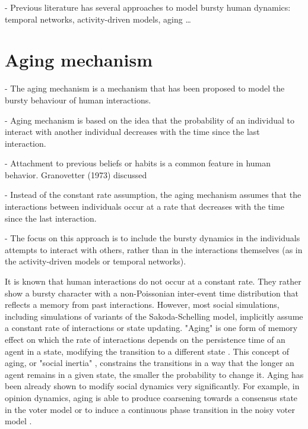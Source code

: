 - Previous literature has several approaches to model bursty human dynamics: temporal networks, activity-driven models, aging \dots

\section{\label{sec:Aging mechanism} Aging mechanism}

- The aging mechanism is a mechanism that has been proposed to model the bursty behaviour of human interactions.

- Aging mechanism is based on the idea that the probability of an individual to interact with another individual decreases with the time since the last interaction.

- Attachment to previous beliefs or habits is a common feature in human behavior. Granovetter (1973) discussed 

- Instead of the constant rate assumption, the aging mechanism assumes that the interactions between individuals occur at a rate that decreases with the time since the last interaction.

- The focus on this approach is to include the bursty dynamics in the individuals attempts to interact with others, rather than in the interactions themselves (as in the activity-driven models or temporal networks).

It is known that human interactions do not occur at a constant rate. They rather show  a bursty character with a non-Poissonian inter-event time distribution that reflects a memory from past interactions. \cite{barabasi-2005,moro,oriol,rybski-2012,zignani-2016,kumar-2020}
However, most social simulations, including simulations of variants of the Sakoda-Schelling model, implicitly assume a constant rate of interactions or state updating. "Aging" is one form of memory effect on which the rate of interactions depends on the persistence time of an agent in a state, modifying the transition to a different state \cite{fernandez-gracia-2011,perez-2016,boguna-2014}. This concept of aging, or "social inertia" \cite{Stark2008}, constrains the transitions in a way that the longer an agent remains in a given state, the smaller the probability to change it. Aging has been already shown to modify social dynamics very significantly. For example, in opinion dynamics, aging is able to produce coarsening towards a consensus state in the voter model \cite{fernandez-gracia-2011,peralta-2020} or to induce a continuous phase transition in the noisy voter model \cite{artime-2018}.

